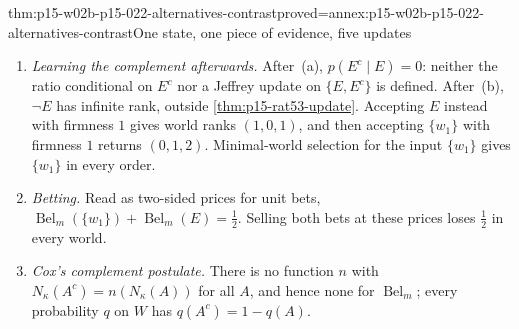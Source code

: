 \begin{hbtheorem}{thm:p15-w02b-p15-022-alternatives-contrast}{proved=annex:p15-w02b-p15-022-alternatives-contrast}{One state, one piece of evidence, five updates}
\begin{enumerate}
\begin{enumerate}
            the belief of \(\{w_2\}\) under \(m_E\) is \(\tfrac12\); and
            the pignistic probability of \(m_E\) is
            \((0,\tfrac34,\tfrac14)\), not \(p(\cdot\mid E)\).
      \item The probabilities \(q^a=(\tfrac34,0,\tfrac14)\) and
            \(q^b=(\tfrac34,\tfrac14,0)\) both dominate
            \(\operatorname{Bel}_m\) on every event, have
            \(q^a(E)=q^b(E)=\tfrac14\), and give
            \(q^a(\{w_2\}\mid E)=0\), \(q^b(\{w_2\}\mid E)=1\). Conditioning
            the members of \(\{q:q\geq\operatorname{Bel}_m\}\) on \(E\)
            therefore gives \(\{w_2\}\) the range \([0,1]\), whereas the
            combination in~(e) gives \([\tfrac12,1]\).
      \end{enumerate}
\item \emph{Learning the complement afterwards.} After~(a),
      \(p(E^c\mid E)=0\): neither the ratio conditional on \(E^c\) nor a
      Jeffrey update on \(\{E,E^c\}\) is defined. After~(b), \(\neg E\)
      has infinite rank, outside \cref{thm:p15-rat53-update}. Accepting
      \(E\) instead with firmness \(1\) gives world ranks \((1,0,1)\), and
      then accepting \(\{w_1\}\) with firmness \(1\) returns \((0,1,2)\).
      Minimal-world selection for the input \(\{w_1\}\) gives \(\{w_1\}\)
      in every order.
\item \emph{Betting.} Read as two-sided prices for unit bets,
      \(\operatorname{Bel}_m(\{w_1\})+\operatorname{Bel}_m(E)=\tfrac12\).
      Selling both bets at these prices loses \(\tfrac12\) in every world.
\item \emph{Cox's complement postulate.} There is no function \(n\) with
      \(N_\kappa(A^c)=n(N_\kappa(A))\) for all \(A\), and hence none for
      \(\operatorname{Bel}_m\); every probability \(q\) on \(W\) has
      \(q(A^c)=1-q(A)\).
\end{enumerate}
\end{hbtheorem}


